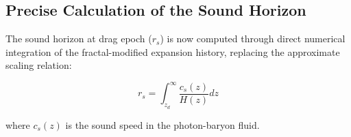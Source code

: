 \documentclass[aps,prl,twocolumn,groupedaddress]{revtex4-2}
\begin{document}
\subsection{Precise Calculation of the Sound Horizon}
The sound horizon at drag epoch ($r_s$) is now computed through direct numerical integration of the fractal-modified expansion history, replacing the approximate scaling relation:

\begin{equation}
r_s = \int_{z_d}^{\infty} \frac{c_s(z)}{H(z)} dz
\end{equation}

where $c_s(z)$ is the sound speed in the photon-baryon fluid.

\end{document}
